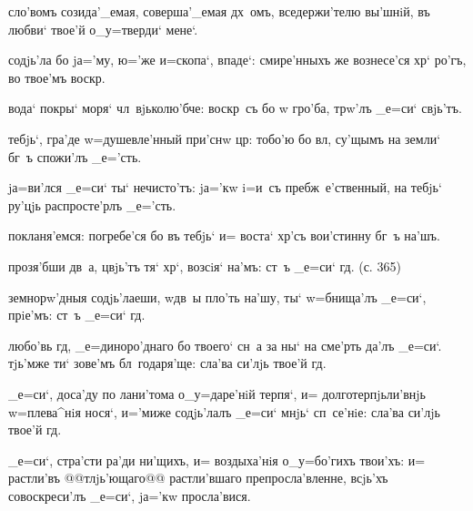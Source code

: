 

сло'вомъ созида'_емая, соверша'_емая дх~омъ, 
вседержи'телю вы'шнiй, въ любви` твое'й о_у=тверди` 
мене`.

содjь'ла бо jа='му, ю='же и=скопа`, впаде`: смире'нныхъ 
же вознесе'ся хр` ро'гъ, во твое'мъ воскр.

вода` покры` моря` чл~вjьколю'бче: воскр~съ бо w\т 
гро'ба, тр w'лъ _е=си` свjь'тъ.

тебjь`, гра'де w=душевле'нный при'снw цр: 
тобо'ю бо вл, су'щымъ на земли` бг~ъ спожи'лъ 
_е='сть.


jа=ви'лся _е=си` ты` нечисто'тъ: jа='кw i=и~съ 
пребж~е'ственный, на тебjь` ру'цjь распросте'рлъ _е='сть.

покланя'емся: погребе'ся бо въ тебjь` и= воста` хр'съ 
вои'стинну бг~ъ на'шъ.


прозя'бши дв~а, цвjь'тъ тя` хр`, возсiя` на'мъ: ст~ъ 
_е=си` гд. (с. 365)

земнорw'дныя содjь'лаеши, w\т дв~ы пло'ть на'шу, ты` 
w=бнища'лъ _е=си`, прiе'мъ: ст~ъ _е=си` гд.


любо'вь гд, _е=диноро'днаго бо твоего` сн~а за ны` на 
сме'рть да'лъ _е=си`. тjь'мже ти` зове'мъ бл~годаря'ще: 
сла'ва си'лjь твое'й гд.

_е=си`, доса'ду по лани'тома о_у=даре'нiй терпя`, и= 
долготерпjьли'внjь w=плева^нiя нося`, и='миже содjь'лалъ 
_е=си` мнjь` сп~се'нiе: сла'ва си'лjь твое'й гд.

_е=си`, стра'сти ра'ди ни'щихъ, и= воздыха'нiя 
о_у=бо'гихъ твои'хъ: и= растли'въ @@тлjь'ющаго@@ 
{растли'вшаго} препросла'вленне, всjь'хъ совоскреси'лъ 
_е=си`, jа='кw просла'вися.

